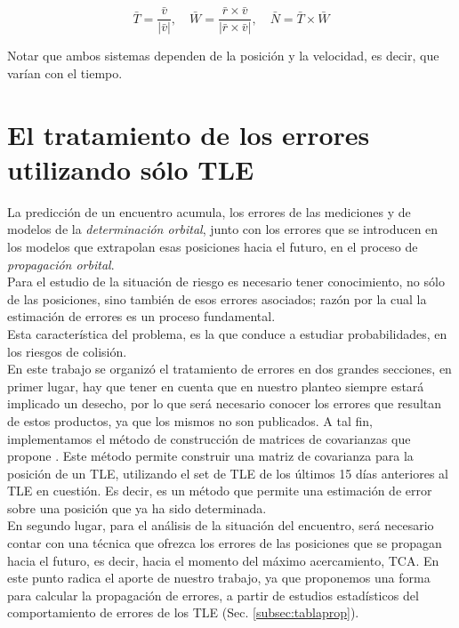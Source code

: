 \begin{equation}
 \bar{T}=\frac{\bar{v}}{|\bar{v}|}, \quad \bar{W}=\frac{\bar{r}\times\bar{v}}{|\bar{r}\times\bar{v}|}, \quad \bar{N}=\bar{T}\times\bar{W}
\end{equation}



Notar que ambos sistemas dependen de la posici\'on y la velocidad, es decir, que var\'ian con el tiempo.\\





\section{El tratamiento de los errores utilizando s\'olo TLE}

La predicci\'on de un encuentro acumula, los errores de las mediciones y de modelos de la  {\it{determinaci\'on orbital}}, junto con los errores que se introducen en los modelos que extrapolan esas posiciones hacia el futuro, en el proceso de {\it{propagaci\'on orbital}}.\\
Para el estudio de la situaci\'on de riesgo es necesario tener conocimiento, no s\'olo de las posiciones, sino tambi\'en de esos errores asociados; raz\'on por la cual la estimaci\'on de errores es un proceso fundamental.\\ 
Esta caracter\'istica del problema, es la que conduce a estudiar probabilidades, en los riesgos de colisi\'on.\\

En este trabajo se organiz\'o el tratamiento de errores en dos grandes secciones, en primer lugar, hay que tener en cuenta que en nuestro planteo siempre estar\'a implicado un desecho, por lo que ser\'a necesario conocer los errores que resultan de estos productos, ya que los mismos no son publicados. A tal fin, implementamos el m\'etodo de construcci\'on de matrices de covarianzas que propone \cite{Osweiler}. Este m\'etodo permite construir una matriz de covarianza para la posici\'on de un TLE, utilizando el set de TLE de los \'ultimos 15 d\'ias anteriores al TLE en cuesti\'on. Es decir, es un m\'etodo que permite una estimaci\'on de error sobre una posici\'on que ya ha sido determinada.\\
En segundo lugar, para el an\'alisis de la situaci\'on del encuentro, ser\'a necesario contar con una t\'ecnica que ofrezca los errores de las posiciones que se propagan hacia el futuro, es decir, hacia el momento del m\'aximo acercamiento, TCA. En este punto radica el aporte de nuestro trabajo, ya que proponemos una forma para calcular la propagaci\'on de errores, a partir de estudios estad\'isticos del comportamiento de errores de los TLE (Sec. \ref{subsec:tablaprop}).\\

